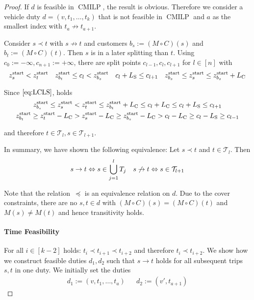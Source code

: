 \begin{proof}

If $d$ is feasible in $\operatorname{CMILP}$, the result is obvious. Therefore we consider a vehicle duty ${d=\left(v,t_1,\dots,t_k\right)}$ that is not feasible in $\operatorname{CMILP}$ and $a$ as the smallest index with ${t_a\not\to t_{a+1}}$.

Consider ${s\prec t}$ with ${s\not\to t}$ and customers ${b_s:=\left(M\circ C\right)(s)}$ and ${b_t:=\left(M\circ C\right)(t)}$. Then $s$ is in a later splitting than $t$. Using ${c_{0}:=-\infty}, {c_{n+1}:=+\infty}$, there are split points $c_{l-1},c_l,c_{l+1}$ for $l\in[n]$ with
\begin{align*}
	z^{\operatorname{start}}_s < z^{\operatorname{start}}_t && z^{\operatorname{start}}_{b_t}\leq c_l <z^{\operatorname{start}}_{b_s} && c_l+L_{\operatorname{S}}\leq c_{l+1} && z^{\operatorname{start}}_{b_s}\leq z^{\operatorname{start}}_s\leq z^{\operatorname{start}}_{b_s}+L_{\operatorname{C}}
\end{align*}

Since $\eqref{eq:LCLS}$, holds
\begin{gather*}
	z^{\operatorname{start}}_{b_s} \leq z^{\operatorname{start}}_s < z^{\operatorname{start}}_t\leq z^{\operatorname{start}}_{b_t}+L_{\operatorname{C}} \leq c_l+L_{\operatorname{C}} \leq c_l+L_{\operatorname{S}} \leq c_{l+1} \\
	z^{\operatorname{start}}_{b_t} \geq z^{\operatorname{start}}_t-L_{\operatorname{C}} > z^{\operatorname{start}}_s-L_{\operatorname{C}} \geq z^{\operatorname{start}}_{b_s}-L_{\operatorname{C}} > c_l-L_{\operatorname{C}}\geq c_l-L_{\operatorname{S}}\geq c_{l-1}
\end{gather*}

and therefore $t\in\mathcal{T}_l,s\in\mathcal{T}_{l+1}$.

In summary, we have shown the following equivalence: Let ${s\prec t}$ and ${t\in\mathcal{T}_l}$. Then
\begin{align*}
	s\to t \Leftrightarrow s\in\bigcup_{j=1}^l T_j && s\not\to t \Leftrightarrow s\in\mathcal{T}_{l+1}
\end{align*}

Note that the relation~$\preceq$ is an equivalence relation on $d$. Due to the cover constraints, there are no ${s,t\in d}$ with ${\left(M\circ C\right)(s)=\left(M\circ C\right)(t)}$ and ${M(s)\neq M(t)}$ and hence transitivity holds.

\paragraph{Time Feasibility} \proofparfill

For all ${i\in[k-2]}$ holds: ${t_i\prec t_{i+1}\prec t_{i+2}}$ and therefore ${t_i\prec t_{i+2}}$. We show how we construct feasible duties $d_1,d_2$ such that ${s\to t}$ holds for all subsequent trips $s,t$ in one duty. We initially set the duties
\begin{align*}
	d_1 := \left(v,t_1,\dots,t_a\right) && d_2 := \left(v',t_{a+1}\right)
\end{align*}


\end{proof}

